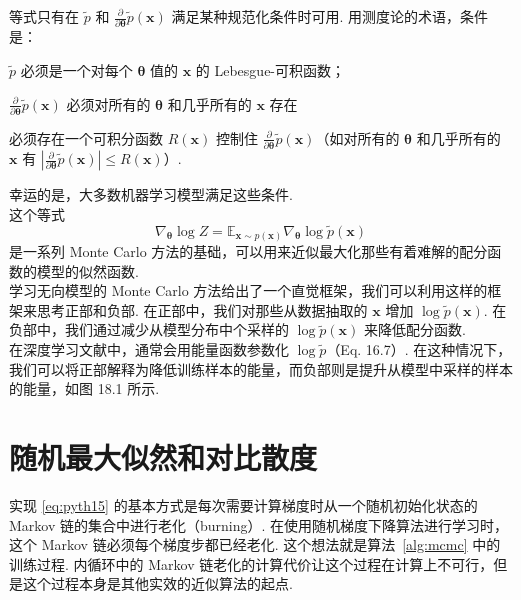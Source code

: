 等式只有在 $\tilde{p}$ 和 $\frac{\partial}{\partial \pmb{\theta}} \tilde{p}(\mathbf{x})$ 满足某种规范化条件时可用. 用测度论的术语，条件是：
\begin{enumerate*}[label={\roman*)}]
\item $\tilde{p}$ 必须是一个对每个 $\pmb{\theta}$ 值的 $\pmb{x}$ 的 Lebesgue-可积函数；
\item $\frac{\partial}{\partial \pmb{\theta}} \tilde{p}(\mathbf{x})$ 必须对所有的 $\pmb{\theta}$ 和几乎所有的 $\pmb{x}$ 存在
\item 必须存在一个可积分函数 $R(\pmb{x})$ 控制住 $\frac{\partial}{\partial \pmb{\theta}} \tilde{p}(\mathbf{x})$（如对所有的 $\pmb{\theta}$ 和几乎所有的 $\pmb{x}$ 有 $|\frac{\partial}{\partial \pmb{\theta}}\tilde{p}(\mathbf{x})|\leq R(\pmb{x})$）.
\end{enumerate*}

幸运的是，大多数机器学习模型满足这些条件.\\

这个等式
\begin{equation}  \label{eq:pyth15}
\nabla_{\pmb{\theta}} \log Z = \mathbb{E}_{\mathbf{x}\sim p(\mathbf{x})} \nabla_{\pmb{\theta}} \log \tilde{p}(\mathbf{x})
\end{equation}
是一系列 Monte Carlo 方法的基础，可以用来近似最大化那些有着难解的配分函数的模型的似然函数.\\

学习无向模型的 Monte Carlo 方法给出了一个直觉框架，我们可以利用这样的框架来思考正部和负部. 在正部中，我们对那些从数据抽取的 $\pmb{x}$ 增加 $\log \tilde{p}(\mathbf{x})$. 在负部中，我们通过减少从模型分布中个采样的 $\log \tilde{p}(\mathbf{x})$ 来降低配分函数.\\

在深度学习文献中，通常会用能量函数参数化 $\log \tilde{p}$（Eq. 16.7）. 在这种情况下，我们可以将正部解释为降低训练样本的能量，而负部则是提升从模型中采样的样本的能量，如图 18.1 所示.

\section{随机最大似然和对比散度}

实现 \eqref{eq:pyth15} 的基本方式是每次需要计算梯度时从一个随机初始化状态的 Markov 链的集合中进行老化（burning）. 在使用随机梯度下降算法进行学习时，这个 Markov 链必须每个梯度步都已经老化. 这个想法就是算法~\ref{alg:mcmc}
中的训练过程. 内循环中的 Markov 链老化的计算代价让这个过程在计算上不可行，但是这个过程本身是其他实效的近似算法的起点. 

